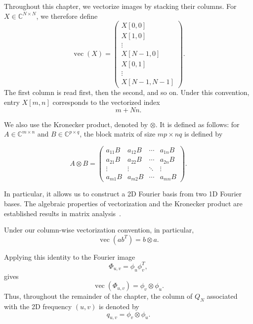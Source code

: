 Throughout this chapter, we vectorize images by stacking their columns. For
$X\in\mathbb{C}^{N\times N}$, we therefore define
\begin{equation}
\operatorname{vec}(X)
=
\begin{pmatrix}
X[0,0] \\
X[1,0] \\
\vdots \\
X[N-1,0] \\
X[0,1] \\
\vdots \\
X[N-1,N-1]
\end{pmatrix}.
\label{eq:def_vectorisation_colonnes}
\end{equation}
The first column is read first, then the second, and so on. Under this convention,
entry $X[m,n]$ corresponds to the vectorized index
\[
    m+Nn.
\]

We also use the Kronecker product, denoted by $\otimes$. It is defined as follows: for
$A \in \mathbb{C}^{m \times n}$ and $B \in \mathbb{C}^{p \times q}$, the block matrix of size
$mp \times nq$ is defined by

$$
A \otimes B =
\begin{pmatrix}
a_{11}B & a_{12}B & \cdots & a_{1n}B \\
a_{21}B & a_{22}B & \cdots & a_{2n}B \\
\vdots  & \vdots  & \ddots & \vdots  \\
a_{m1}B & a_{m2}B & \cdots & a_{mn}B
\end{pmatrix}.
$$

In particular, it allows us to construct
a 2D Fourier basis from two 1D Fourier bases. The algebraic properties of
vectorization and the Kronecker product are established results in matrix analysis~\cite{horn2013matrix}.

Under our column-wise vectorization convention, in particular,
\begin{equation}
    \operatorname{vec}(ab^T)
    =
    b\otimes a.
    \label{eq:vec_produit_exterieur}
\end{equation}

Applying this identity to the Fourier image
\[
    \Phi_{u,v}=\phi_u\phi_v^T,
\]
gives
\begin{equation}
    \operatorname{vec}(\Phi_{u,v})
    =
    \phi_v\otimes\phi_u.
    \label{eq:vec_fourier_2d}
\end{equation}
Thus, throughout the remainder of the chapter, the column of $Q_N$ associated with the 2D frequency $(u,v)$ is denoted by
\[
    q_{u,v}
    =
    \phi_v\otimes\phi_u.
\]

